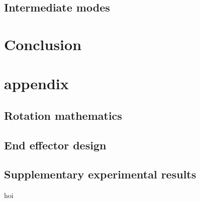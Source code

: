 \documentclass[a4paper, 10pt, conference]{ieeeconf}
\begin{document}
    \subsection{Intermediate modes}

    \section{Conclusion}
    
\clearpage
\section*{appendix}
\subsection{Rotation mathematics}
\subsection{End effector design}
\subsection{Supplementary experimental results}
hoi
\end{document}
